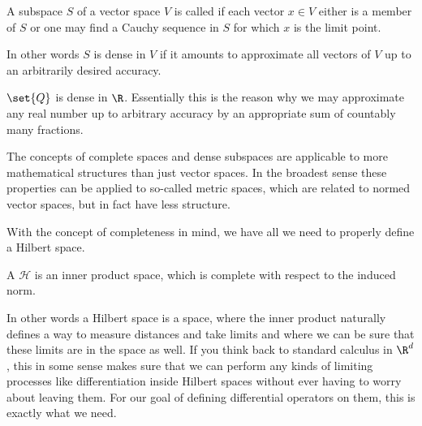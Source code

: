 \begin{defn}
	A subspace $S$ of a vector space $V$ is called 
	if each vector $x \in V$ either is a member of $S$ or one may find
	a Cauchy sequence in $S$ for which $x$ is the limit point.
\end{defn}
In other words $S$ is dense in $V$ if it amounts to approximate
all vectors of $V$ up to an arbitrarily desired accuracy.

\begin{exmp}
	$\set{Q}$ is dense in $\R$. 
	Essentially this is the reason why we may approximate any real number
	up to arbitrary accuracy by an appropriate sum of countably many fractions.
\end{exmp}

\begin{nte}
	The concepts of complete spaces and dense subspaces
	are applicable to more mathematical structures than just vector spaces.
	In the broadest sense these properties can be applied to so-called
	metric spaces, which are related to normed vector spaces,
	but in fact have less structure.
\end{nte}

With the concept of completeness in mind,
we have all we need to properly define a Hilbert space.
\begin{defn}
	A  $\mathcal{H}$ is an inner product space,
	which is complete with respect to the induced norm.
\end{defn}
In other words a Hilbert space is a space,
where the inner product naturally defines a way to measure distances
and take limits and where we can be sure that these limits are in the space as well.
If you think back to standard calculus in $\R^d$,
this in some sense makes sure that we can perform any kinds of limiting processes
like differentiation inside Hilbert spaces without ever having to worry
about leaving them.
For our goal of defining differential operators on them,
this is exactly what we need.

